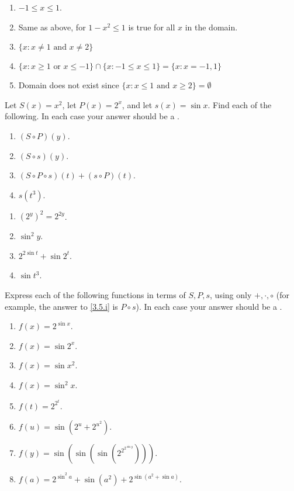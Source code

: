 \begin{solution}
  \begin{enumerate}[label=(\roman*)]
    \item $-1 \leq x \leq 1$.
    \item Same as above, for $1 - x^2 \leq 1$ is true for all $x$ in the domain.
    \item $\{ x: x\neq1 \text{ and } x\neq2 \}$
    \item $\{ x: x \geq 1 \text{ or } x \leq -1 \} \cap
    \{ x: -1 \leq x \leq 1 \} = \{x: x = -1,1\}$
    \item Domain does not exist since $\{ x: x \leq 1 \text{ and } x \geq 2 \}
    = \emptyset$
  \end{enumerate}
\end{solution}

\begin{pr} \label{3.4}
  Let $S(x) = x^2$, let $P(x) = 2^x$, and let $s(x) = \sin x$. Find each of the
  following. In each case your answer should be a .
  \begin{enumerate}[label = (\roman*)]
    \item $(S \circ P)(y)$.
    \item $(S \circ s)(y)$.
    \item $(S \circ P \circ s)(t) + (s \circ P)(t)$.
    \item $s(t^3)$.
  \end{enumerate}
\end{pr}

\begin{solution}
  \begin{enumerate}[label=(\roman*)]
    \item $(2^y)^2 = 2^{2y}$.
    \item $\sin^2 y$.
    \item $2^{2\sin t} + \sin 2^t$.
    \item $\sin t^3$.
  \end{enumerate}
\end{solution}

\begin{pr} \label{3.5}
  Express each of the following functions in terms of $S, P, s$, using only
  $+,\cdot,\circ$ (for example, the answer to \ref{3.5.i} is $P \circ s$). In each
  case your answer should be a .
  \begin{enumerate}[label = (\roman*)]
    \item \label{3.5.i} $f(x) = 2^{\sin x}$.
    \item $f(x) = \sin 2^x$.
    \item $f(x) = \sin x^2$.
    \item $f(x) = \sin^2 x$.
    \item $f(t) = 2^{2^t}$.
    \item $f(u) = \sin (2^u + 2^{u^2})$.
    \item $f(y) = \sin (\sin (\sin (2^{2^{2^{\sin y}}})))$.
    \item $f(a) = 2^{\sin^2 a} + \sin (a^2) + 2^{\sin (a^2 + \sin a)}$.
  \end{enumerate}
\end{pr}

